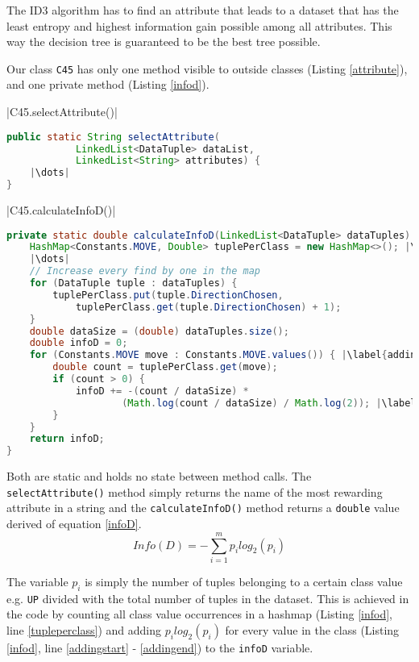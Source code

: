 \documentclass{article}
\begin{document}
    The ID3 algorithm has to find an attribute that leads to a dataset that has the least entropy and highest information gain possible among all attributes. This way the decision tree is guaranteed to be the best tree possible.

    Our class \verb|C45| has only one method visible to outside classes (Listing \ref{attribute}), and one private method (Listing \ref{infod}).

    \vspace{1cm}
    |C45.selectAttribute()|
    \begin{lstlisting}[language=Java, caption=Method definition of \protect\UseVerb{term}, label={attribute}, escapechar=|]
public static String selectAttribute(
            LinkedList<DataTuple> dataList,
            LinkedList<String> attributes) {
    |\dots|
}
    \end{lstlisting}

    \newpage

    |C45.calculateInfoD()|
    \begin{lstlisting}[language=Java, caption=Method definition of \protect\UseVerb{term2}, label={infod}, escapechar=|]
private static double calculateInfoD(LinkedList<DataTuple> dataTuples) {
    HashMap<Constants.MOVE, Double> tuplePerClass = new HashMap<>(); |\label{tupleperclass}|
    |\dots|
    // Increase every find by one in the map
    for (DataTuple tuple : dataTuples) {
        tuplePerClass.put(tuple.DirectionChosen,
            tuplePerClass.get(tuple.DirectionChosen) + 1);
    }
    double dataSize = (double) dataTuples.size();
    double infoD = 0;
    for (Constants.MOVE move : Constants.MOVE.values()) { |\label{addingstart}|
        double count = tuplePerClass.get(move);
        if (count > 0) {
            infoD += -(count / dataSize) *
                    (Math.log(count / dataSize) / Math.log(2)); |\label{addingend}|
        }
    }
    return infoD;
}\end{lstlisting}

    Both are static and holds no state between method calls. The \verb|selectAttribute()| method simply returns the name of the most rewarding attribute in a string and the \verb|calculateInfoD()| method returns a \verb|double| value derived of equation \ref{infoD}.
    \begin{equation} \label{infoD}
    Info(D)=-\sum_{i=1}^{m}p_i log_2(p_i)
    \end{equation}

    The variable $p_i$ is simply the number of tuples belonging to a certain class value e.g. \verb|UP| divided with the total number of tuples in the dataset. This is achieved in the code by counting all class value occurrences in a hashmap (Listing \ref{infod}, line \ref{tupleperclass}) and adding $p_i log_2(p_i)$ for every value in the class (Listing \ref{infod}, line \ref{addingstart} - \ref{addingend}) to the \verb|infoD| variable.
\end{document}
